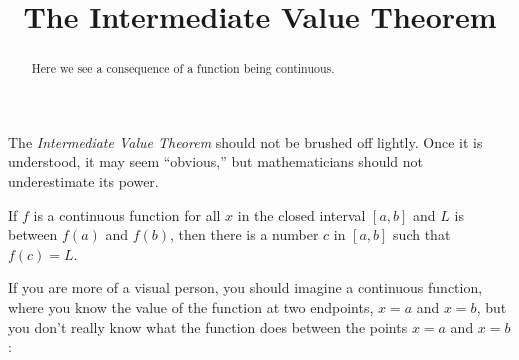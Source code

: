 \documentclass{ximera}
\title[Dig-In:]{The Intermediate Value Theorem}
\begin{document}
\begin{abstract}
  Here we see a consequence of a function being continuous.
\end{abstract}
\maketitle



The \textit{Intermediate Value Theorem} should not be brushed off
lightly. Once it is understood, it may seem ``obvious,'' but
mathematicians should not underestimate its power.

\begin{theorem}\label{theorem:IVT}
	If $f$ is a continuous function for all $x$ in the closed interval
	$[a,b]$ and $L$ is between $f(a)$ and $f(b)$, then there is a number
	$c$ in $[a, b]$ such that $f(c) = L$.
\end{theorem}


If you are more of a visual person, you should imagine a continuous
function, where you know the value of the function at two endpoints,
$x=a$ and $x=b$, but you don't really know what the function does
between the points $x=a$ and $x=b$:
\end{document}
